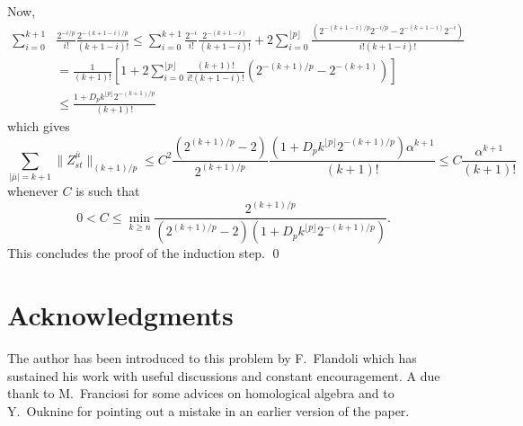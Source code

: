 \documentclass[a4paper,12pt,reqno]{amsproc}
\newcommand{\norm}[1]{\lVert #1\rVert}
\begin{document}
Now,
\begin{equation*}
  \begin{split}
\sum_{i=0}^{k+1} &
\frac{2^{-i/p}}{i!} \frac{2^{-(k+1-i)/p}}{(k+1-i)!} \le
    \sum_{i=0}^{k+1} 
\frac{2^{-i}}{i!} \frac{2^{-(k+1-i)}}{(k+1-i)!} +2 \sum_{i=0}^{\lfloor p \rfloor}
\frac{ (2^{-(k+1-i)/p} 2^{-i/p}-2^{-(k+1-i)} 2^{-i})}{i!(k+1-i)!}
\\ & = \frac{1}{(k+1)!}\left[1+2
\sum_{i=0}^{\lfloor p \rfloor}
\frac{(k+1)!}{i!(k+1-i)!} (2^{-(k+1)/p} -2^{-(k+1)})
\right]
\\ & \le \frac{1+D_p k^{\lfloor p \rfloor} 2^{-(k+1)/p}}{(k+1)!}
  \end{split}
\end{equation*}
which gives
\begin{equation*}
  \sum_{|\bar\mu| = k+1} \norm{Z^{\bar\mu}_{st}}_{(k+1)/p} \le
  C^2 \frac{(2^{(k+1)/p}-2)}{2^{(k+1)/p}}  
\frac{(1+D_p k^{\lfloor p \rfloor} 2^{-(k+1)/p})\alpha^{k+1}}{(k+1)!}
\le
C \frac{\alpha^{k+1}}{(k+1)!}
\end{equation*}
whenever $C$ is such that
\begin{equation}
\label{eq:smallness_of_C}
 0 < C \le  \min_{k \ge n} \frac{2^{(k+1)/p}}{(2^{(k+1)/p}-2)(1+D_p k^{\lfloor p \rfloor}
 2^{-(k+1)/p})}.
\end{equation}
This concludes the proof of the induction step.
\qed

\section*{Acknowledgments}
The author has been introduced to this problem by F.~Flandoli which
has sustained his work with useful discussions and  constant
encouragement. 
A due thank to M.~Franciosi for some advices on
homological algebra and to Y.~Ouknine for pointing out a mistake in an
earlier version of the paper.
   
\end{document}
